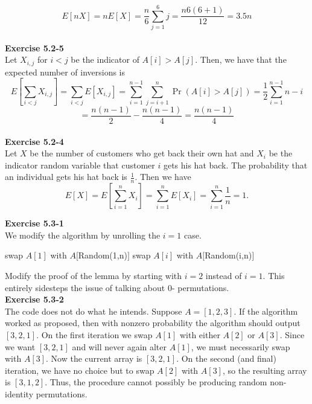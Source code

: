 \documentclass{article}
\begin{document}
\[
E[nX] = nE[X] = \frac{n}{6} \sum_{j=1}^6 j = \frac{n 6(6+1)}{12} = 3.5 n
\]\\


\noindent\textbf{Exercise 5.2-5}\\

Let $X_{i,j}$ for $i<j$ be the indicator of $A[i] > A[j]$. Then, we have that the expected number of inversions is
\[
E\left[\sum_{i<j} X_{i,j}\right] = \sum_{i<j} E[X_{i,j}] = \sum_{i=1}^{n-1} \sum_{j=i+1}^n \Pr(A[i] > A[j]) = \frac{1}{2} \sum_{i=1}^{n-1} n-i \]\[= \frac{n(n-1)}{2} - \frac{n(n-1)}{4} = \frac{n(n-1)}{4}  
\]\\

\noindent\textbf{Exercise 5.2-4}\\

Let $X$ be the number of customers who get back their own hat and $X_i$ be the indicator random variable that customer $i$ gets his hat back.  The probability that an individual gets his hat back is $\frac{1}{n}$.  Then we have
\[ E[X] = E\left[ \sum_{i=1}^n X_i \right] = \sum_{i=1}^n E[X_i] = \sum_{i=1}^n \frac{1}{n} = 1.\]

\noindent\textbf{Exercise 5.3-1}\\

We modify the algorithm by unrolling the $i=1$ case.
\begin{algorithm}
\begin{algorithmic}[1]
\State swap $A[1]$ with $A[$Random(1,n)$]$
\State swap $A[i]$ with $A[$Random(i,n)$]$
\EndFor
\end{algorithmic}
\end{algorithm}


Modify the proof of the lemma by starting with $i=2$ instead of $i=1$. This entirely sidesteps the issue of talking about $0$- permutations.\\

\noindent\textbf{Exercise 5.3-2}\\

The code does not do what he intends.  Suppose $A = [1,2,3]$.  If the algorithm worked as proposed, then with nonzero probability the algorithm should output $[3,2,1]$.  On the first iteration we swap $A[1]$ with either $A[2]$ or $A[3]$.  Since we want $[3,2,1]$ and will never again alter $A[1]$, we must necessarily swap with $A[3]$.  Now the current array is $[3,2,1]$.  On the second (and final) iteration, we have no choice but to swap $A[2]$ with $A[3]$, so the resulting array is $[3,1,2]$.  Thus, the procedure cannot possibly be producing random non-identity permutations. \\
\end{document}
